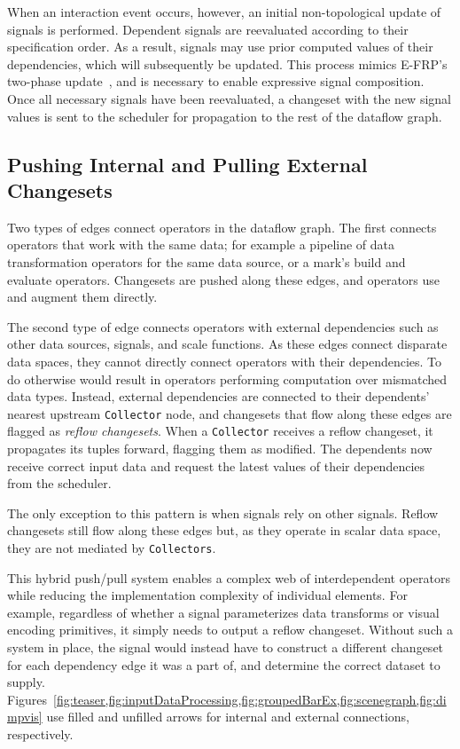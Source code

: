 When an interaction event occurs, however, an initial non-topological update of
signals is performed. Dependent signals are reevaluated according to their
specification order. As a result, signals may use prior computed values of their
dependencies, which will subsequently be updated. This process mimics E-FRP's
two-phase update~\cite{wan:efrp}, and is necessary to enable expressive signal
composition. Once all necessary signals have been reevaluated, a changeset with
the new signal values is sent to the scheduler for propagation to the rest of
the dataflow graph.

\subsection{Pushing Internal and Pulling External Changesets}

Two types of edges connect operators in the dataflow graph. The first connects
operators that work with the same data; for example a pipeline of data
transformation operators for the same data source, or a mark's build and
evaluate operators. Changesets are pushed along these edges, and operators
use and augment them directly.

The second type of edge connects operators with external dependencies such as
other data sources, signals, and scale functions. As these edges connect
disparate data spaces, they cannot directly connect operators with their
dependencies. To do otherwise would result in operators performing computation
over mismatched data types. Instead, external dependencies are connected to
their dependents' nearest upstream \texttt{Collector} node, and changesets that
flow along these edges are flagged as \emph{reflow changesets}. When a
\texttt{Collector} receives a reflow changeset, it propagates its tuples
forward, flagging them as modified. The dependents now receive correct input
data and request the latest values of their dependencies from the scheduler.

The only exception to this pattern is when signals rely on other signals.
Reflow changesets still flow along these edges but, as they operate in scalar
data space, they are not mediated by \texttt{Collectors}.

This hybrid push/pull system enables a complex web of interdependent operators
while reducing the implementation complexity of individual elements. For
example, regardless of whether a signal parameterizes data transforms or visual
encoding primitives, it simply needs to output a reflow changeset. Without such
a system in place, the signal would instead have to construct a different
changeset for each dependency edge it was a part of, and determine the correct
dataset to supply.
Figures~\cref{fig:teaser,fig:inputDataProcessing,fig:groupedBarEx,fig:scenegraph,fig:dimpvis}
use filled and unfilled arrows for internal and external connections,
respectively.

